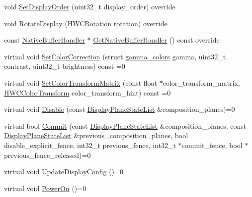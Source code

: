 \begin{DoxyCompactItemize}
\item 
void \mbox{\hyperlink{classhwcomposer_1_1PhysicalDisplay_ae5d26a97e43c84a53d396ca946afbbef}{Set\+Display\+Order}} (uint32\+\_\+t display\+\_\+order) override
\item 
void \mbox{\hyperlink{classhwcomposer_1_1PhysicalDisplay_ae9650158e46bd03af1d06aa0e64f3ae6}{Rotate\+Display}} (H\+W\+C\+Rotation rotation) override
\item 
const \mbox{\hyperlink{classhwcomposer_1_1NativeBufferHandler}{Native\+Buffer\+Handler}} $\ast$ \mbox{\hyperlink{classhwcomposer_1_1PhysicalDisplay_ab10ddca2b99e21d8fef188205900d021}{Get\+Native\+Buffer\+Handler}} () const override
\item 
virtual void \mbox{\hyperlink{classhwcomposer_1_1PhysicalDisplay_a81bddc91d8f593a1f1cb2248d7206386}{Set\+Color\+Correction}} (struct \mbox{\hyperlink{structhwcomposer_1_1gamma__colors}{gamma\+\_\+colors}} gamma, uint32\+\_\+t contrast, uint32\+\_\+t brightness) const =0
\item 
virtual void \mbox{\hyperlink{classhwcomposer_1_1PhysicalDisplay_a89ded7e09902c8c3c707c041412f1c02}{Set\+Color\+Transform\+Matrix}} (const float $\ast$color\+\_\+transform\+\_\+matrix, \mbox{\hyperlink{hwcdefs_8h_a1a2c55aec4fbd12a1e323f2bdb3e9b88}{H\+W\+C\+Color\+Transform}} color\+\_\+transform\+\_\+hint) const =0
\item 
virtual void \mbox{\hyperlink{classhwcomposer_1_1PhysicalDisplay_af309ebed456ecdf3eb935ce693f326d1}{Disable}} (const \mbox{\hyperlink{namespacehwcomposer_adf383ae435d39a5631a8ad82e7fa18a4}{Display\+Plane\+State\+List}} \&composition\+\_\+planes)=0
\item 
virtual bool \mbox{\hyperlink{classhwcomposer_1_1PhysicalDisplay_a1db680248cf31fdf1d2d1e926355916d}{Commit}} (const \mbox{\hyperlink{namespacehwcomposer_adf383ae435d39a5631a8ad82e7fa18a4}{Display\+Plane\+State\+List}} \&composition\+\_\+planes, const \mbox{\hyperlink{namespacehwcomposer_adf383ae435d39a5631a8ad82e7fa18a4}{Display\+Plane\+State\+List}} \&previous\+\_\+composition\+\_\+planes, bool disable\+\_\+explicit\+\_\+fence, int32\+\_\+t previous\+\_\+fence, int32\+\_\+t $\ast$commit\+\_\+fence, bool $\ast$previous\+\_\+fence\+\_\+released)=0
\item 
virtual void \mbox{\hyperlink{classhwcomposer_1_1PhysicalDisplay_aa3cb8537967c34dce7e8ba7762cbd48c}{Update\+Display\+Config}} ()=0
\item 
virtual void \mbox{\hyperlink{classhwcomposer_1_1PhysicalDisplay_a954fbb8be8c69890094ddacc510f4a85}{Power\+On}} ()=0
\item 

\end{DoxyCompactItemize}
